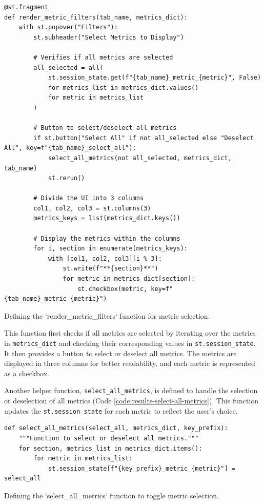 \begin{longlisting}
\begin{verbatim}
@st.fragment
def render_metric_filters(tab_name, metrics_dict):
    with st.popover("Filters"):
        st.subheader("Select Metrics to Display")

        # Verifies if all metrics are selected
        all_selected = all(
            st.session_state.get(f"{tab_name}_metric_{metric}", False)
            for metrics_list in metrics_dict.values()
            for metric in metrics_list
        )

        # Button to select/deselect all metrics
        if st.button("Select All" if not all_selected else "Deselect All", key=f"{tab_name}_select_all"):
            select_all_metrics(not all_selected, metrics_dict, tab_name)
            st.rerun()

        # Divide the UI into 3 columns
        col1, col2, col3 = st.columns(3)
        metrics_keys = list(metrics_dict.keys())

        # Display the metrics within the columns
        for i, section in enumerate(metrics_keys):
            with [col1, col2, col3][i % 3]:
                st.write(f"**{section}**")
                for metric in metrics_dict[section]:
                    st.checkbox(metric, key=f"{tab_name}_metric_{metric}")
\end{verbatim}
\caption{Defining the `render\_metric\_filters` function for metric selection.}
\label{code:results-render-metric-filters}
\end{longlisting}

This function first checks if all metrics are selected by iterating over the metrics in \texttt{metrics\_dict} and checking their corresponding values in \texttt{st.session\_state}. It then provides a button to select or deselect all metrics. The metrics are displayed in three columns for better readability, and each metric is represented as a checkbox.

Another helper function, \texttt{select\_all\_metrics}, is defined to handle the selection or deselection of all metrics (Code \ref{code:results-select-all-metrics}). This function updates the \texttt{st.session\_state} for each metric to reflect the user's choice.

\begin{longlisting}
\begin{verbatim}
def select_all_metrics(select_all, metrics_dict, key_prefix):
    """Function to select or deselect all metrics."""
    for section, metrics_list in metrics_dict.items():
        for metric in metrics_list:
            st.session_state[f"{key_prefix}_metric_{metric}"] = select_all
\end{verbatim}
\caption{Defining the `select\_all\_metrics` function to toggle metric selection.}
\label{code:results-select-all-metrics}
\end{longlisting}

